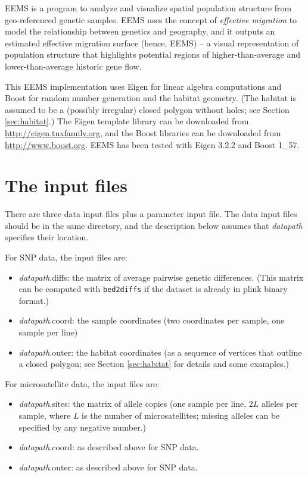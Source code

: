 \documentclass[a4paper,10pt,DIV=15,mpinclude=true]{scrartcl}
\begin{document}
EEMS is a program to analyze and visualize spatial population structure from geo-referenced genetic samples. EEMS uses the concept of \textit{effective migration} to model the relationship between genetics and geography, and it outputs an estimated effective migration surface (hence, EEMS) -- a visual representation of population structure that highlights potential regions of higher-than-average and lower-than-average historic gene flow.

This EEMS implementation uses Eigen for linear algebra computations and Boost for random number generation and the habitat geometry. (The habitat is assumed to be a (possibly irregular) closed polygon without holes; see Section \ref{sec:habitat}.) The Eigen template library can be downloaded from \url{http://eigen.tuxfamily.org}, and the Boost libraries can be downloaded from \url{http://www.boost.org}. EEMS has been tested with Eigen 3.2.2 and Boost 1\_57.

\section{The input files}

There are three data input files plus a parameter input file. The data input files should be in the same directory, and the description below assumes that \textit{datapath} specifies their location.

For SNP data, the input files are:
\begin{itemize}
  \item \textit{datapath}.diffs: the matrix of average pairwise genetic differences. (This matrix can be computed with {\tt bed2diffs} if the dataset is already in plink binary format.)
  \item \textit{datapath}.coord: the sample coordinates (two coordinates per sample, one sample per line)
  \item \textit{datapath}.outer: the habitat coordinates (as a sequence of vertices that outline a closed polygon; see Section \ref{sec:habitat} for details and some examples.)
\end{itemize}

For microsatellite data, the input files are:
\begin{itemize}
  \item \textit{datapath}.sites: the matrix of allele copies (one sample per line, $2L$ alleles per sample, where $L$ is the number of microsatellites; missing alleles can be specified by any negative number.)
  \item \textit{datapath}.coord: as described above for SNP data.
  \item \textit{datapath}.outer: as described above for SNP data.
\end{itemize}
\end{document}
